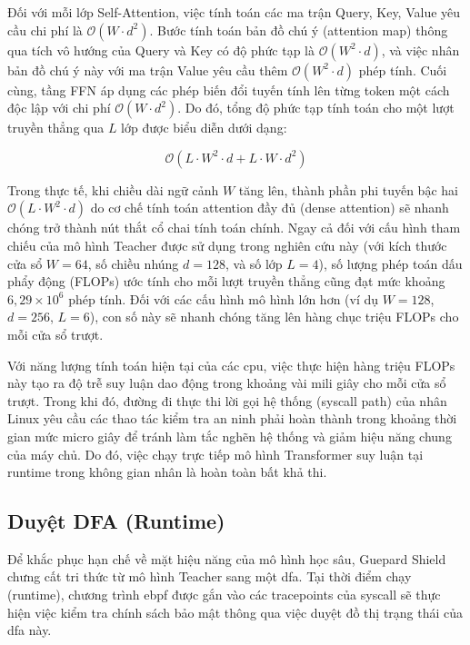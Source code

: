 \documentclass[../main.tex]{subfiles}
\begin{document}
Đối với mỗi lớp Self-Attention, việc tính toán các ma trận Query,
Key, Value yêu cầu chi phí là $\mathcal{O}(W \cdot d^2)$. Bước tính
toán bản đồ chú ý (attention map) thông qua tích vô hướng của Query
và Key có độ phức tạp là $\mathcal{O}(W^2 \cdot d)$, và việc nhân bản
đồ chú ý này với ma trận Value yêu cầu thêm $\mathcal{O}(W^2 \cdot
d)$ phép tính. Cuối cùng, tầng FFN áp dụng các phép biến đổi tuyến
tính lên từng token một cách độc lập với chi phí $\mathcal{O}(W \cdot
d^2)$. Do đó, tổng độ phức tạp tính toán cho một lượt truyền thẳng
qua $L$ lớp được biểu diễn dưới dạng:

\begin{equation}
  \label{eq:transformer_complexity}
  \mathcal{O}\left(L \cdot W^2 \cdot d + L \cdot W \cdot d^2\right)
\end{equation}

Trong thực tế, khi chiều dài ngữ cảnh $W$ tăng lên, thành phần phi
tuyến bậc hai $\mathcal{O}(L \cdot W^2 \cdot d)$ do cơ chế tính toán
attention đầy đủ (dense attention) sẽ nhanh chóng trở thành nút thắt
cổ chai tính toán chính. Ngay cả đối với cấu hình tham chiếu của mô
hình Teacher được sử dụng trong nghiên cứu này (với kích thước cửa sổ
$W = 64$, số chiều nhúng $d = 128$, và số lớp $L = 4$), số lượng phép
toán dấu phẩy động (FLOPs) ước tính cho mỗi lượt truyền thẳng cũng
đạt mức khoảng $6,29 \times 10^6$ phép tính. Đối với các cấu hình mô
hình lớn hơn (ví dụ $W = 128$, $d = 256$, $L = 6$), con số này sẽ
nhanh chóng tăng lên hàng chục triệu FLOPs cho mỗi cửa sổ trượt.

Với năng lượng tính toán hiện tại của các \gls{cpu},
việc thực hiện hàng triệu FLOPs này tạo ra độ trễ suy luận dao động
trong khoảng vài mili giây cho mỗi cửa sổ trượt. Trong khi đó, đường
đi thực thi lời gọi hệ thống (\gls{syscall} path) của nhân Linux yêu cầu
các thao tác kiểm tra an ninh phải hoàn thành trong khoảng thời gian
mức micro giây để tránh làm tắc nghẽn hệ thống và giảm hiệu năng
chung của máy chủ. Do đó, việc chạy trực tiếp mô hình Transformer suy
luận tại runtime trong không gian nhân là hoàn toàn bất khả thi.

\subsection{Duyệt DFA (Runtime)}
\label{subsec:dfa_traversal_complexity}

Để khắc phục hạn chế về mặt hiệu năng của mô hình học sâu, Guepard
Shield chưng cất tri thức từ mô hình Teacher sang một \gls{dfa}. Tại thời điểm chạy (runtime), chương trình \gls{ebpf}
được gắn vào các tracepoints của \gls{syscall} sẽ thực hiện việc kiểm tra
chính sách bảo mật thông qua việc duyệt đồ thị trạng thái của \gls{dfa} này.
\end{document}

